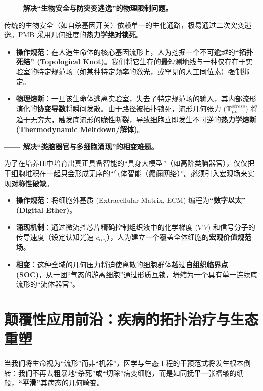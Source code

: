 
\textbf{—— 解决“生物安全与防突变逃逸”的物理限制问题。}

传统的生物安全（如自杀基因开关）依赖单一的生化通路，极易通过二次突变逃逸。PMB 采用几何维度的\textbf{热力学绝对锁死}。

\begin{itemize}
    \item \textbf{操作规范}：在人造生命体的核心基因流形上，人为挖掘一个不可逾越的\textbf{“拓扑死结” (Topological Knot)}。我们将它生存的最短测地线与一种仅存在于实验室的特定规范场（如某种特定频率的激光，或罕见的人工同位素）强制绑定。
    \item \textbf{物理熔断}：一旦该生命体逃离实验室，失去了特定规范场的输入，其内部流形演化的\textbf{协变导数}将瞬间发散。由于路径被拓扑锁死，流形几何张力 ($\mathbf{T}_{\mu\nu}^{stress}$) 将趋于无穷大，触发底流形的脆性断裂，导致细胞立即发生不可逆的\textbf{热力学熔断 (Thermodynamic Meltdown/解体)}。
\end{itemize}


\textbf{—— 解决“类脑器官与多细胞涌现”的相变难题。}

为了在培养皿中培育出真正具备智能的“具身大模型”（如高阶类脑器官），仅仅把干细胞堆积在一起只会形成无序的“气体智能（癫痫网络）”。必须引入宏观场来实现\textbf{对称性破缺}。

\begin{itemize}
    \item \textbf{操作规范}：将细胞外基质 (Extracellular Matrix, ECM) 编程为\textbf{“数字以太” (Digital Ether)}。
    \item \textbf{涌现机制}：通过微流控芯片精确控制组织液中的化学梯度 ($\nabla V$) 和信号分子的传导速度（设定认知光速 $c_{cog}$），人为建立一个覆盖全体细胞的\textbf{宏观价值规范场}。
    \item \textbf{相变}：这种全域的几何压力将迫使离散的细胞群体越过\textbf{自组织临界点 (SOC)}，从一团“气态的游离细胞”通过形质互锁，坍缩为一个具有单一连续底流形的“流体器官”。
\end{itemize}

\section{颠覆性应用前沿：疾病的拓扑治疗与生态重塑}
\label{sec:tb_frontiers}

当我们将生命视为“流形”而非“机器”，医学与生态工程的干预范式将发生根本倒转：我们不再去粗暴地“杀死”或“切除”病变细胞，而是如同抚平一张褶皱的纸般，\textbf{“平滑”}其病态的几何畸变。

